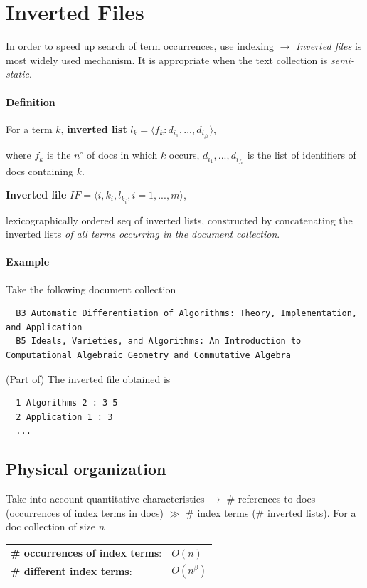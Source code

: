 \section{Inverted Files}
In order to speed up search of term occurrences, use indexing $\rightarrow$ \emph{Inverted files} is most widely used mechanism. It is appropriate when the text collection is \emph{semi-static}.

\paragraph{Definition} For a term $k$, \textbf{inverted list} $l_k = \langle f_k : d_{i_1}, ..., d_{i_{f_k}} \rangle$,

where $f_k$ is the $n^\circ$ of docs in which $k$ occurs, $d_{i_1}, ..., d_{i_{f_k}}$ is the list of identifiers of docs containing $k$.

\textbf{Inverted file} $IF = \langle i, k_i, l_{k_i}, i = 1,..., m \rangle$,

lexicographically ordered seq of inverted lists, constructed by concatenating the inverted lists \emph{of all terms occurring in the document collection}.

\paragraph{Example}Take the following document collection
\begin{lstlisting}
  B3 Automatic Differentiation of Algorithms: Theory, Implementation, and Application
  B5 Ideals, Varieties, and Algorithms: An Introduction to Computational Algebraic Geometry and Commutative Algebra
\end{lstlisting}

(Part of) The inverted file obtained is
\begin{lstlisting}
  1 Algorithms 2 : 3 5
  2 Application 1 : 3
  ...
\end{lstlisting}

\subsection{Physical organization}
Take into account quantitative characteristics $\longrightarrow$ \# references to docs (occurrences of index terms in docs) $\gg$ \# index terms (\# inverted lists). For a doc collection of size $n$
\begin{tabular}{ll}
  \textbf{\# occurrences of index terms}: & $O(n)$ \\
  \textbf{\# different index terms}: & $O(n^\beta)$
\end{tabular}

